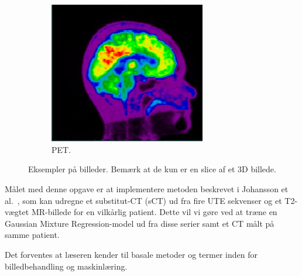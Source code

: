 \begin{figure}
\begin{subfigure}{0.3\textwidth}
        \includegraphics[width=0.75\textwidth]{billeder/pet.png}
        \caption{PET.}
        \label{eksempel:pet}
    \end{subfigure}\hfill
    \caption{Eksempler på billeder. Bemærk at de kun er en slice af et 3D billede.}
    \label{eksempel}
\end{figure}


Målet med denne opgave er at implementere metoden beskrevet i
Johansson et al.~\cite{johansson}, som kan udregne et substitut-CT (sCT)
ud fra fire UTE sekvenser og et T2-vægtet MR-billede for en vilkårlig
patient. Dette vil vi gøre ved at træne en Gaussian Mixture Regression-model ud fra disse serier samt et CT målt på samme patient.

Det forventes at læseren kender til basale metoder og termer inden for
billedbehandling og maskinlæring.

